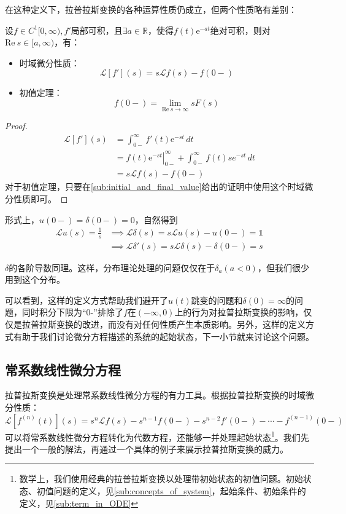 \documentclass{ctexbook}
\newcommand{\evalat}[3]{\left.#1\right|_{#2}^{#3}}
\begin{document}
在这种定义下，拉普拉斯变换的各种运算性质仍成立，但两个性质略有差别：
\begin{proposition}[改进的拉普拉斯变换的性质]
    设$f\in C^1[0,\infty),f'$局部可积，且$\exists a\in\mathbb{R}$，使得$f(t)\mathrm{e}^{-at}$绝对可积，则对$\text{Re}\ s\in[a,\infty)$，有：
    \begin{itemize}
        \item 时域微分性质：\[\mathcal{L} [f'](s)=s\mathcal{L} f(s)-f(0-)\]
        \item 初值定理：$$f(0-)=\lim_{\text{Re}\ s\to\infty}sF(s)$$
    \end{itemize}
\end{proposition}
\begin{proof}
    \begin{align*}
        \mathcal{L} [f'](s)&=\int_{0-}^{\infty}f'(t)\mathrm{e}^{-st}\,dt\\
        &=\evalat{f(t)\mathrm{e}^{-st}}{0-}{\infty}+\int_{0-}^{\infty}f(t)se^{-st}\,dt\\
        &=s\mathcal{L} f(s)-f(0-)
    \end{align*}
    对于初值定理，只要在\ref{sub:initial_and_final_value}给出的证明中使用这个时域微分性质即可。
\end{proof}

形式上，$u(0-)=\delta(0-)=0$，自然得到
\begin{align*}
    \mathcal{L} u(s)=\frac{1}{s}&\implies\mathcal{L} \delta(s)=s\mathcal{L} u(s)-u(0-)=\mathds{1}\\
    &\implies\mathcal{L} \delta'(s)=s\mathcal{L} \delta(s)-\delta(0-)=s
\end{align*}

$\delta$的各阶导数同理。这样，分布理论处理的问题仅仅在于$\delta_a(a<0)$，但我们很少用到这个分布。

可以看到，这样的定义方式帮助我们避开了$u(t)$跳变的问题和$\delta(0)=\infty$的问题，同时积分下限为“0-”排除了$f$在$(-\infty,0)$上的行为对拉普拉斯变换的影响，仅仅是拉普拉斯变换的改进，而没有对任何性质产生本质影响。另外，这样的定义方式有助于我们讨论微分方程描述的系统的起始状态，下一小节就来讨论这个问题。

\subsection{常系数线性微分方程}\label{sub:laplace_ODE}
拉普拉斯变换是处理常系数线性微分方程的有力工具。根据拉普拉斯变换的时域微分性质：
\[\mathcal{L}\left[f^{(n)}(t)\right](s)=s^n\mathcal{L} f(s)-s^{n-1}f(0-)-s^{n-2}f'(0-)-\cdots -f^{(n-1)}(0-)\]
可以将常系数线性微分方程转化为代数方程，还能够一并处理起始状态\footnote{数学上，我们使用经典的拉普拉斯变换以处理带初始状态的初值问题。初始状态、初值问题的定义，见\ref{sub:concepts_of_system}，起始条件、初始条件的定义，见\ref{sub:term_in_ODE}}。我们先提出一个一般的解法，再通过一个具体的例子来展示拉普拉斯变换的威力。
\end{document}
